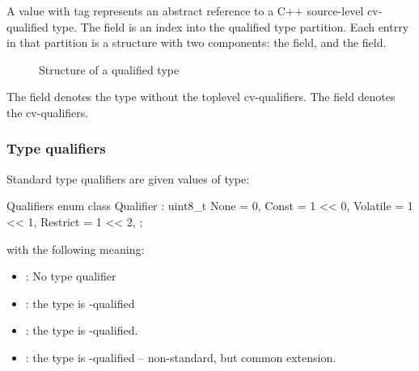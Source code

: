 A  value with tag  represents
an abstract reference to a C++ source-level cv-qualified type.
The  field is an index into the qualified type partition.
Each entrry in that partition is a structure with two components: the  field,
and the  field.
%
\begin{figure}[H]
	\centering
	\caption{Structure of a qualified type}
	\label{fig:ifc-qualified-type-structure}
\end{figure}
%
The  field denotes the type without the toplevel cv-qualifiers.
The  field denotes the cv-qualifiers.


\subsubsection{Type qualifiers}
\label{sec:ifc-type-qualifiers}

Standard type qualifiers are given values of type:
\begin{typedef}{Qualifiers}{}
	enum class Qualifier : uint8_t {
		None		= 0,
		Const		= 1 << 0,
		Volatile		= 1 << 1,
		Restrict		= 1 << 2,
	};
\end{typedef}
with the following meaning:
\begin{itemize}
	\item {}: No type qualifier
	\item {}: the type is -qualified
	\item {}: the type is -qualified.
	\item {}: the type is -qualified -- non-standard, but common extension.
\end{itemize}


\subsection{}
\label{sec:ifc:TypeSort:Base}

